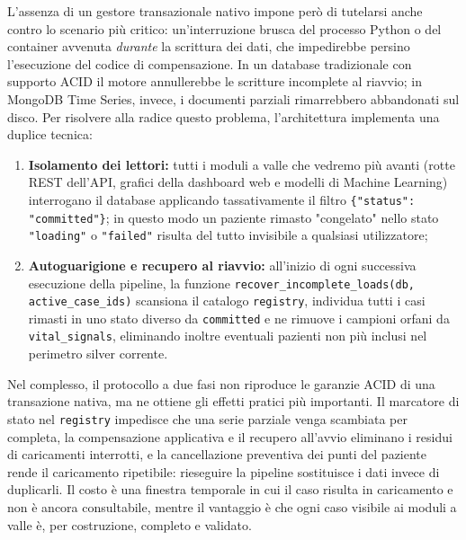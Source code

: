 L'assenza di un gestore transazionale nativo impone per\`o di tutelarsi anche contro lo scenario pi\`u critico: un'interruzione brusca del processo Python o del container avvenuta \textit{durante} la scrittura dei dati, che impedirebbe persino l'esecuzione del codice di compensazione. In un database tradizionale con supporto ACID il motore annullerebbe le scritture incomplete al riavvio; in MongoDB Time Series, invece, i documenti parziali rimarrebbero abbandonati sul disco. Per risolvere alla radice questo problema, l'architettura implementa una duplice tecnica:
\begin{enumerate}
    \item \textbf{Isolamento dei lettori:} tutti i moduli a valle che vedremo pi\`u avanti (rotte REST dell'API, grafici della dashboard web e modelli di Machine Learning) interrogano il database applicando tassativamente il filtro \texttt{\{"status": "committed"\}}; in questo modo un paziente rimasto "congelato" nello stato \texttt{"loading"} o \texttt{"failed"} risulta del tutto invisibile a qualsiasi utilizzatore;    \item \textbf{Autoguarigione e recupero al riavvio:} all'inizio di ogni successiva esecuzione della pipeline, la funzione \texttt{recover\_incomplete\_loads(db, active\_case\_ids)} scansiona il catalogo \texttt{registry}, individua tutti i casi rimasti in uno stato diverso da \texttt{committed} e ne rimuove i campioni orfani da \texttt{vital\_signals}, eliminando inoltre eventuali pazienti non pi\`u inclusi nel perimetro silver corrente.\end{enumerate}
Nel complesso, il protocollo a due fasi non riproduce le garanzie ACID di una transazione nativa, ma ne ottiene gli effetti pratici pi\`u importanti. Il marcatore di stato nel \texttt{registry} impedisce che una serie parziale venga scambiata per completa, la compensazione applicativa e il recupero all'avvio eliminano i residui di caricamenti interrotti, e la cancellazione preventiva dei punti del paziente rende il caricamento ripetibile: rieseguire la pipeline sostituisce i dati invece di duplicarli. Il costo \`e una finestra temporale in cui il caso risulta in caricamento e non \`e ancora consultabile, mentre il vantaggio \`e che ogni caso visibile ai moduli a valle \`e, per costruzione, completo e validato.

